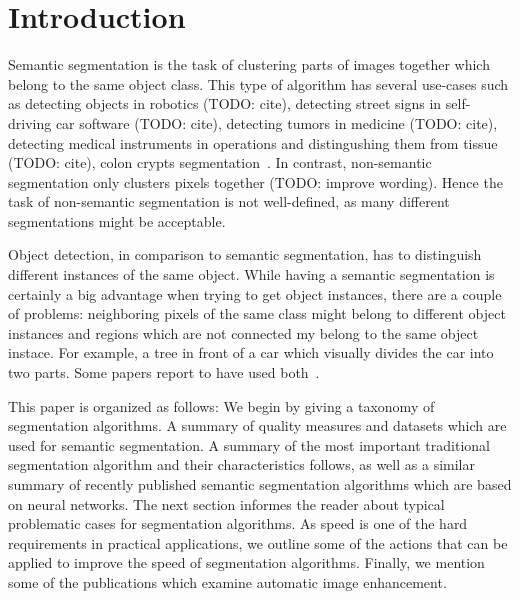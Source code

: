 \section{Introduction}\label{sec:introduction}
Semantic segmentation is the task of clustering parts of images together which
belong to the same object class. This type of algorithm has several use-cases such as
detecting objects in robotics (TODO: cite), detecting street signs in
self-driving car software (TODO: cite), detecting tumors in medicine (TODO:
cite), detecting medical instruments in operations and distingushing them from
tissue (TODO: cite), colon crypts segmentation~\cite{cohen2015memory}. In
contrast, non-semantic segmentation only clusters pixels together (TODO:
improve wording). Hence the task of non-semantic segmentation is not
well-defined, as many different segmentations might be acceptable.

Object detection, in comparison to semantic segmentation, has to distinguish
different instances of the same object. While having a semantic segmentation is
certainly a big advantage when trying to get object instances, there are a
couple of problems: neighboring pixels of the same class might belong to
different object instances and regions which are not connected my belong to the
same object instace. For example, a tree in front of a car which visually
divides the car into two parts. Some papers report to have used
both~\cite{tighe2014scene}.



This paper is organized as follows: We begin by giving a taxonomy of
segmentation algorithms. %
A summary of quality measures and datasets which are used for semantic
segmentation. A summary of the most important traditional segmentation
algorithm and their characteristics follows, as well as a similar summary of
recently published semantic segmentation algorithms which are based on neural
networks. The next section informes the reader about typical problematic cases
for segmentation algorithms. As speed is one of the hard requirements in
practical applications, we outline some of the actions that can be applied to
improve the speed of segmentation algorithms. Finally, we mention some of the
publications which examine automatic image enhancement.
